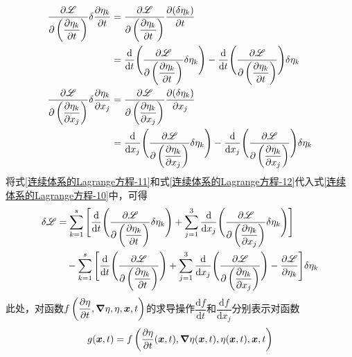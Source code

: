 \begin{align}
	\frac{\partial \mathscr{L}}{\partial \left(\dfrac{\partial \eta_k}{\partial t}\right)} \delta \dfrac{\partial \eta_k}{\partial t} & = \frac{\partial \mathscr{L}}{\partial \left(\dfrac{\partial \eta_k}{\partial t}\right)} \dfrac{\partial (\delta \eta_k)}{\partial t} \nonumber \\
	& = \frac{\mathrm{d}}{\mathrm{d}t} \Bigg(\frac{\partial \mathscr{L}}{\partial \left(\dfrac{\partial \eta_k}{\partial t}\right)} \delta \eta_k\Bigg) - \frac{\mathrm{d}}{\mathrm{d}t} \Bigg(\frac{\partial \mathscr{L}}{\partial \left(\dfrac{\partial \eta_k}{\partial t}\right)}\Bigg) \delta \eta_k \label{连续体系的Lagrange方程-11} \\
	\frac{\partial \mathscr{L}}{\partial \left(\dfrac{\partial \eta_k}{\partial x_j}\right)} \delta \dfrac{\partial \eta_k}{\partial x_j} & = \frac{\partial \mathscr{L}}{\partial \left(\dfrac{\partial \eta_k}{\partial x_j}\right)} \dfrac{\partial (\delta \eta_k)}{\partial x_j} \nonumber \\
	& = \frac{\mathrm{d}}{\mathrm{d}x_j} \Bigg(\frac{\partial \mathscr{L}}{\partial \left(\dfrac{\partial \eta_k}{\partial x_j}\right)} \delta \eta_k\Bigg) - \frac{\mathrm{d}}{\mathrm{d}x_j} \Bigg(\frac{\partial \mathscr{L}}{\partial \left(\dfrac{\partial \eta_k}{\partial x_j}\right)}\Bigg) \delta \eta_k \label{连续体系的Lagrange方程-12}
\end{align}
将式\eqref{连续体系的Lagrange方程-11}和式\eqref{连续体系的Lagrange方程-12}代入式\eqref{连续体系的Lagrange方程-10}中，可得
\begin{align}
	\delta \mathscr{L} & = \sum_{k=1}^s \Bigg[\frac{\mathrm{d}}{\mathrm{d}t} \Bigg(\frac{\partial \mathscr{L}}{\partial \left(\dfrac{\partial \eta_k}{\partial t}\right)} \delta \eta_k\Bigg) + \sum_{j=1}^3 \frac{\mathrm{d}}{\mathrm{d}x_j} \Bigg(\frac{\partial \mathscr{L}}{\partial \left(\dfrac{\partial \eta_k}{\partial x_j}\right)} \delta \eta_k\Bigg)\Bigg] \nonumber \\
	& \quad {}- \sum_{k=1}^s \Bigg[\frac{\mathrm{d}}{\mathrm{d}t} \Bigg(\frac{\partial \mathscr{L}}{\partial \left(\dfrac{\partial \eta_k}{\partial t}\right)}\Bigg) + \sum_{j=1}^3 \frac{\mathrm{d}}{\mathrm{d}x_j} \Bigg(\frac{\partial \mathscr{L}}{\partial \left(\dfrac{\partial \eta_k}{\partial x_j}\right)}\Bigg) - \frac{\partial \mathscr{L}}{\partial \eta_k}\Bigg] \delta \eta_k
	\label{连续体系的Lagrange方程-13}
\end{align}
此处，对函数$f\left(\dfrac{\partial \eta}{\partial t},\boldsymbol{\nabla} \eta,\eta,\boldsymbol{x},t\right)$的求导操作$\dfrac{\mathrm{d} f}{\mathrm{d}t}$和$\dfrac{\mathrm{d} f}{\mathrm{d}x_j}$分别表示对函数
\begin{equation*}
	g(\boldsymbol{x},t) = f\left(\dfrac{\partial \eta}{\partial t}(\boldsymbol{x},t),\boldsymbol{\nabla} \eta(\boldsymbol{x},t),\eta(\boldsymbol{x},t),\boldsymbol{x},t\right)
\end{equation*}
